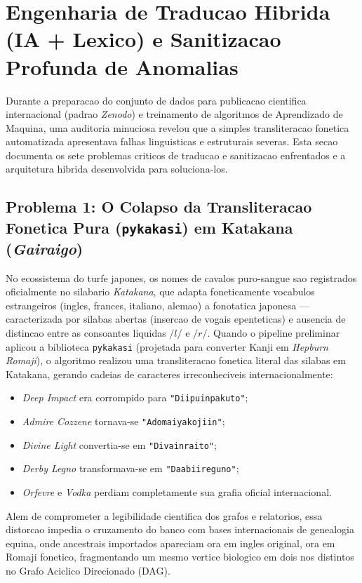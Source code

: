 \documentclass[12pt,a4paper]{article}
\begin{document}
\section{Engenharia de Traducao Hibrida (IA + Lexico) e Sanitizacao Profunda de Anomalias}

Durante a preparacao do conjunto de dados para publicacao cientifica internacional (padrao \textit{Zenodo}) e treinamento de algoritmos de Aprendizado de Maquina, uma auditoria minuciosa revelou que a simples transliteracao fonetica automatizada apresentava falhas linguisticas e estruturais severas. Esta secao documenta os sete problemas criticos de traducao e sanitizacao enfrentados e a arquitetura hibrida desenvolvida para soluciona-los.

\subsection{Problema 1: O Colapso da Transliteracao Fonetica Pura (\texttt{pykakasi}) em Katakana (\textit{Gairaigo})}
No ecossistema do turfe japones, os nomes de cavalos puro-sangue sao registrados oficialmente no silabario \textit{Katakana}, que adapta foneticamente vocabulos estrangeiros (ingles, frances, italiano, alemao) a fonotatica japonesa --- caracterizada por silabas abertas (insercao de vogais epenteticas) e ausencia de distincao entre as consoantes liquidas $/l/$ e $/r/$.
Quando o pipeline preliminar aplicou a biblioteca \texttt{pykakasi} (projetada para converter Kanji em \textit{Hepburn Romaji}), o algoritmo realizou uma transliteracao fonetica literal das silabas em Katakana, gerando cadeias de caracteres irreconheciveis internacionalmente:
\begin{itemize}
    \item \textit{Deep Impact} era corrompido para \texttt{"Diipuinpakuto"};
    \item \textit{Admire Cozzene} tornava-se \texttt{"Adomaiyakojiin"};
    \item \textit{Divine Light} convertia-se em \texttt{"Divainraito"};
    \item \textit{Derby Legno} transformava-se em \texttt{"Daabiireguno"};
    \item \textit{Orfevre} e \textit{Vodka} perdiam completamente sua grafia oficial internacional.
\end{itemize}
Alem de comprometer a legibilidade cientifica dos grafos e relatorios, essa distorcao impedia o cruzamento do banco com bases internacionais de genealogia equina, onde ancestrais importados apareciam ora em ingles original, ora em Romaji fonetico, fragmentando um mesmo vertice biologico em dois nos distintos no Grafo Aciclico Direcionado (DAG).
\end{document}

